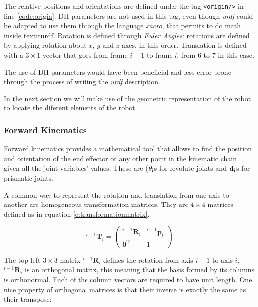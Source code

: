 The relative positions and orientations are defined under the tag \lstinline{<origin/>} in line \ref{code:origin}. DH parameters are not used in this tag, even though \textit{urdf} could be adapted to use them through the language \textit{xacro}, that permits to do math inside textit{urdf}. Rotation is defined through \textit{Euler Angles}:  rotations are defined by applying rotation about $x$, $y$ and $z$ axes, in this order. Translation is defined with a $3 \times 1$ vector that goes from frame $i-1$ to frame $i$, from $6$ to $7$ in this case.

The use of DH parameters would have been beneficial and less error prone through the process of writing the \textit{urdf} description.

In the next section we will make use of the geometric representation of the robot to locate the diferent elements of the robot.

\subsubsection{Forward Kinematics}
\label{sss:FK}

Forward kinematics provides a mathematical tool that allows to find the position and orientation of the end effector or any other point in the kinematic chain given all the joint variables' values. These are ($\bf{\theta_i}$s for revolute joints and $\bf{d_i}$s for prismatic joints.

A common way to represent the rotation and translation from one axis to another are homogeneous transformation matrices. They are $4 \times 4$ matrices defined as in equation \ref{e:transformationmatrix}.

\begin{equation}
    \label{e:transformationmatrix}
    ^{i-1}\mathbf{T}_{i} = \left(\begin{array}{cc}
    ^{i-1} \mathbf{R}_{i} & ^{i-1} \boldsymbol{p}_{i} \\
    \mathbf{0}^{\mathrm{T}} & 1
    \end{array}\right)
\end{equation}

The top left $3 \times 3$ matrix $^{i-1} \mathbf{R}_{i}$ defines the rotation from axis $i-1$ to axis $i$. $^{i-1} \mathbf{R}_{i}$ is an orthogonal matrix, this meaning that the basis formed by its columns is orthonormal. Each of the column vectors are required to have unit length. One nice property of orthogonal matrices is that their inverse is exactly the same as their transpose:

